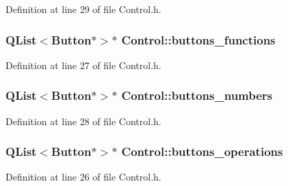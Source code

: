 Definition at line 29 of file Control.\+h.

\hypertarget{classControl_ada5bc6208e19fb16e73c0000164db11a}{}
\subsubsection[{buttons\+\_\+functions}]{\setlength{\rightskip}{0pt plus 5cm}Q\+List$<${\bf Button}$\ast$$>$$\ast$ Control\+::buttons\+\_\+functions\hspace{0.3cm}{\ttfamily [protected]}}\label{classControl_ada5bc6208e19fb16e73c0000164db11a}


Definition at line 27 of file Control.\+h.

\hypertarget{classControl_a1675f42401d90e37e0273f991c6886b6}{}
\subsubsection[{buttons\+\_\+numbers}]{\setlength{\rightskip}{0pt plus 5cm}Q\+List$<${\bf Button}$\ast$$>$$\ast$ Control\+::buttons\+\_\+numbers\hspace{0.3cm}{\ttfamily [protected]}}\label{classControl_a1675f42401d90e37e0273f991c6886b6}


Definition at line 28 of file Control.\+h.

\hypertarget{classControl_adc925de7c9359450654d0ebf03304a07}{}
\subsubsection[{buttons\+\_\+operations}]{\setlength{\rightskip}{0pt plus 5cm}Q\+List$<${\bf Button}$\ast$$>$$\ast$ Control\+::buttons\+\_\+operations\hspace{0.3cm}{\ttfamily [protected]}}\label{classControl_adc925de7c9359450654d0ebf03304a07}


Definition at line 26 of file Control.\+h.

\hypertarget{classControl_ae666eb91a7f9f964a07e779798cd18c8}{}
